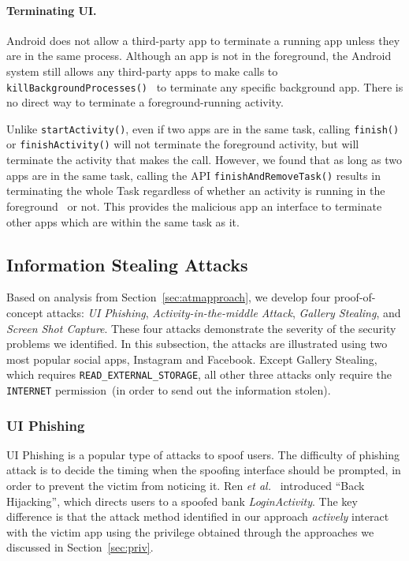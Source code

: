 \documentclass[letterpaper,12pt]{article}
\begin{document}
\paragraph*{Terminating UI.}
Android does not allow a third-party app to terminate a running app
unless they are in the same process. Although an app is not in the
foreground, the Android system still allows any third-party apps to
make calls to
\texttt{killBackgroundProcesses()}~\cite{killBackgroundProcesses} to
terminate any specific background app. There is no direct way to
terminate a foreground-running activity.

Unlike \texttt{startActivity()}, even if two apps are in the same
task, calling \texttt{finish()} or \texttt{finishActivity()} will not
terminate the foreground activity, but will terminate the activity
that makes the call. However, we found that as long as two apps are in
the same task, calling the API \texttt{finishAndRemoveTask()} results
in terminating the whole Task regardless of whether an activity is
running in the foreground~\cite{finishAndRemoveTask} or not.
This provides the malicious app an interface to terminate other apps which are within the same task as it.

\subsection{Information Stealing Attacks}\label{sec:infoattack}
Based on analysis from Section~\ref{sec:atmapproach}, we develop
four proof-of-concept attacks: \textsl{UI Phishing},
\textsl{Activity-in-the-middle Attack}, \textsl{Gallery Stealing}, and
\textsl{Screen Shot Capture}. These four attacks demonstrate the
severity of the security problems we identified. In this subsection, the
attacks are illustrated using two most popular social apps, Instagram
and Facebook. Except Gallery Stealing, which requires
\texttt{READ\_EXTERNAL\_STORAGE}, all other three attacks only require
the \texttt{INTERNET} permission~(in order to send out the information
stolen).

\subsubsection{UI Phishing}
UI Phishing is a popular type of attacks to spoof users.  The
difficulty of phishing attack is to decide the timing when the
spoofing interface should be prompted, in order to prevent the victim
from noticing it.  Ren {\em et al.}~\cite{TaskHijacking} introduced
``Back Hijacking'', which directs users to a spoofed bank
\textit{LoginActivity}. The key difference is that the attack method
identified in our approach {\em actively} interact with the victim app
using the privilege obtained through the approaches we discussed in
Section~\ref{sec:priv}.
\end{document}
